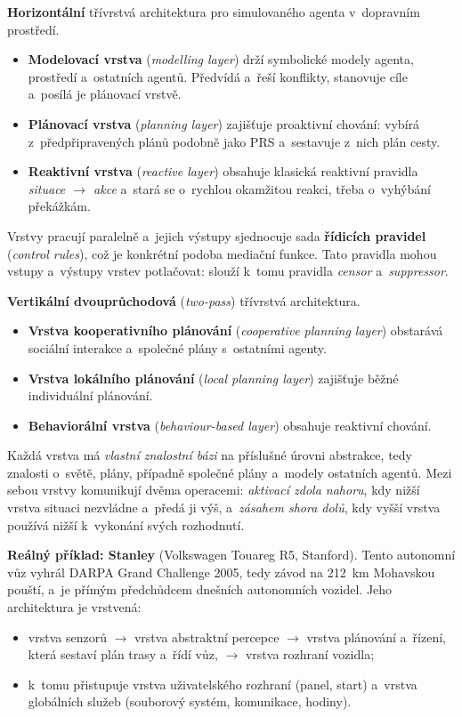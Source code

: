 \documentclass[11pt,a4paper]{article}
\theoremstyle{definition}
\begin{document}
\begin{defbox}
\textbf{Horizontální} třívrstvá architektura pro simulovaného agenta v~dopravním prostředí.
\begin{itemize}
\item \textbf{Modelovací vrstva} (\emph{modelling layer}) drží symbolické modely agenta,
  prostředí a~ostatních agentů. Předvídá a~řeší konflikty, stanovuje cíle a~posílá je
  plánovací vrstvě.
\item \textbf{Plánovací vrstva} (\emph{planning layer}) zajišťuje proaktivní chování: vybírá
  z~předpřipravených plánů podobně jako PRS a~sestavuje z~nich plán cesty.
\item \textbf{Reaktivní vrstva} (\emph{reactive layer}) obsahuje klasická reaktivní pravidla
  \emph{situace $\to$ akce} a~stará se o~rychlou okamžitou reakci, třeba o~vyhýbání překážkám.
\end{itemize}
Vrstvy pracují paralelně a~jejich výstupy sjednocuje sada \textbf{řídicích pravidel}
(\emph{control rules}), což je konkrétní podoba mediační funkce. Tato pravidla mohou vstupy
a~výstupy vrstev potlačovat: slouží k~tomu pravidla \emph{censor} a~\emph{suppressor}.
\end{defbox}

\begin{defbox}
\textbf{Vertikální dvouprůchodová} (\emph{two-pass}) třívrstvá architektura.
\begin{itemize}
\item \textbf{Vrstva kooperativního plánování} (\emph{cooperative planning layer}) obstarává
  sociální interakce a~společné plány s~ostatními agenty.
\item \textbf{Vrstva lokálního plánování} (\emph{local planning layer}) zajišťuje běžné
  individuální plánování.
\item \textbf{Behaviorální vrstva} (\emph{behaviour-based layer}) obsahuje reaktivní chování.
\end{itemize}
Každá vrstva má \emph{vlastní znalostní bázi} na příslušné úrovni abstrakce, tedy znalosti
o~světě, plány, případně společné plány a~modely ostatních agentů. Mezi sebou vrstvy komunikují
dvěma operacemi: \emph{aktivací zdola nahoru}, kdy nižší vrstva situaci nezvládne a~předá ji
výš, a~\emph{zásahem shora dolů}, kdy vyšší vrstva používá nižší k~vykonání svých rozhodnutí.
\end{defbox}

\medskip
\noindent\textbf{Reálný příklad: Stanley} (Volkswagen Touareg R5, Stanford). Tento autonomní
vůz vyhrál DARPA Grand Challenge 2005, tedy závod na 212~km Mohavskou pouští, a~je přímým
předchůdcem dnešních autonomních vozidel. Jeho architektura je vrstvená:
\begin{itemize}
\item vrstva senzorů $\to$ vrstva abstraktní percepce $\to$ vrstva plánování a~řízení,
  která sestaví plán trasy a~řídí vůz, $\to$ vrstva rozhraní vozidla;
\item k~tomu přistupuje vrstva uživatelského rozhraní (panel, start) a~vrstva globálních služeb
  (souborový systém, komunikace, hodiny).
\end{itemize}
\end{document}
